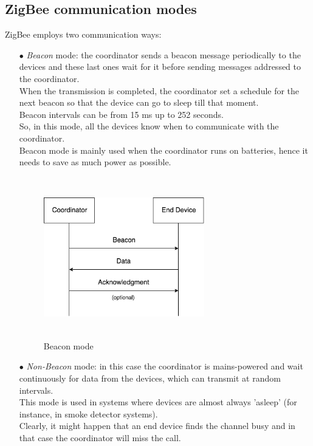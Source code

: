 \documentclass[12pt]{report}
\begin{document}
{{\subsection{ZigBee communication modes}
\bigskip
ZigBee employs two communication ways:
\bigskip
\begin{itemize}
\setlength{\itemindent}{+4mm}
\item[$\bullet$] \emph{Beacon} mode: the coordinator sends a beacon message periodically to the devices and these last ones wait for it before sending messages addressed to the coordinator.\\
When the transmission is completed, the coordinator set a schedule for the next beacon so that the device can go to sleep till that moment.\\
Beacon intervals can be from 15 ms up to 252 seconds.\\
So, in this mode, all the devices know when to communicate with the coordinator.\\
Beacon mode is mainly used when the coordinator runs on batteries, hence it needs to save as much power as possible.

\begin{figure}[H]
\includegraphics[width=7cm,height=7cm,keepaspectratio]{zigbee_beaconmode}
\centering
\caption{Beacon mode}
\end{figure}

\item[$\bullet$] \emph{Non-Beacon} mode: in this case the coordinator is mains-powered and wait continuously for data from the devices, which can transmit at random intervals.\\
This mode is used in systems where devices are almost always 'asleep' (for instance, in smoke detector systems).\\
Clearly, it might happen that an end device finds the channel busy and in that case the coordinator will miss the call.


\end{itemize}}}
\end{document}
